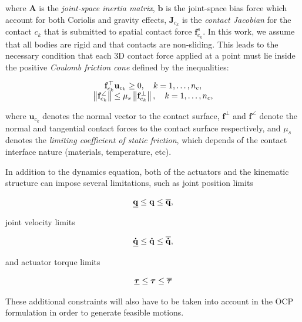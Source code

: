 where $\mathbf{A}$ is the \emph{joint-space inertia matrix},
$\mathbf{b}$ is the joint-space bias force which account for both
Coriolis and gravity effects, $\mathbf{J}_{c_k}$ is the \emph{contact
  Jacobian} for the contact $c_k$ that is submitted to spatial contact
force $\mathbf{f}^s_{c_k}$. In this work, we assume that all bodies
are rigid and that contacts are non-sliding. This leads to the
necessary condition that each 3D contact force applied at a point must
lie inside the positive \emph{Coulomb friction cone} \cite{trinkle1997dynamic}
defined by the inequalities:

\begin{equation}
  \label{eq:chap3-friction-cone}
  \begin{array}{c}
    \mathbf{f}_{c_k}^{\top}\mathbf{u}_{c_k} \ge 0, \quad k=1,\dots,n_c, \\
    \left\lVert \mathbf{f}_{c_k}^\angle \right\rVert \le
    \mu_s\left\lVert \mathbf{f}_{c_k}^\bot \right\rVert, \quad k=1,\dots,n_c,
  \end{array}
\end{equation}

where $\mathbf{u}_{c_k}$ denotes the normal vector to the contact
surface, $\mathbf{f}^\bot$ and $\mathbf{f}^\angle$ denote the normal
and tangential contact forces to the contact surface respectively, and
$\mu_s$ denotes the \emph{limiting coefficient of static friction},
which depends of the contact interface nature (materials, temperature,
etc).

In addition to the dynamics equation, both of the actuators and the
kinematic structure can impose several limitations, such as joint
position limits

\begin{equation}
  \underline{\mathbf{q}} \le \mathbf{q} \le \overline{\mathbf{q}},
\end{equation}

joint velocity limits

\begin{equation}
  \underline{\mathbf{\dot{q}}} \le \mathbf{\dot{q}} \le
  \overline{\mathbf{\dot{q}}},
\end{equation}

and actuator torque limits

\begin{equation}
  \underline{\boldsymbol{\tau}} \le \boldsymbol{\tau} \le
  \overline{\boldsymbol{\tau}}
\end{equation}

These additional constraints will also have to be taken into account
in the OCP formulation in order to generate feasible motions.

